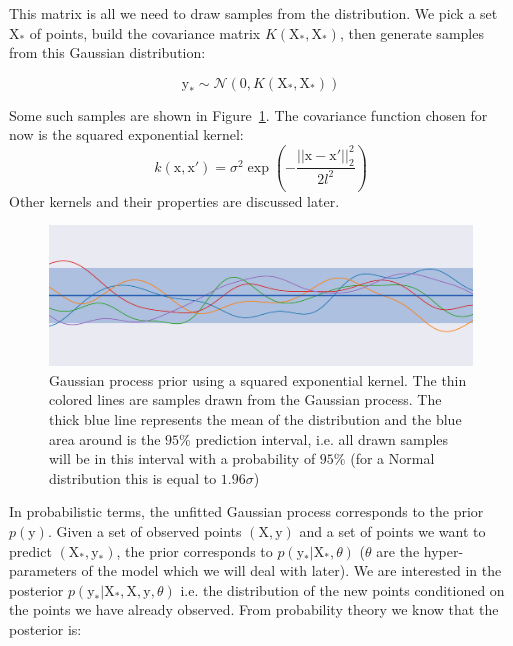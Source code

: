 This matrix is all we need to draw samples from the distribution. We pick a set $\mathrm{X_*}$ of points, build the covariance matrix $K(\mathrm{X_*}, \mathrm{X_*})$, then generate samples from this Gaussian distribution:

\begin{equation}
    \mathrm{y_*} \sim \mathcal{N} \left( 0, K(\mathrm{X_*}, \mathrm{X_*})\right)
\end{equation}

Some such samples are shown in Figure~\ref{fig:gp_prior}. The covariance function chosen for now is the squared exponential kernel:
\begin{equation}
	k(\mathrm{x}, \mathrm{x'}) = \sigma^2 \exp\left( -\frac{||\mathrm{x} - \mathrm{x'}||_2^2}{2l^2}\right)
	\label{eq:sqexp}
\end{equation}
Other kernels and their properties are discussed later. 


\begin{figure}[htb]
	\centering
	\includegraphics[width=\linewidth]{img_hyperopt/gp_prior.png}
	\caption{Gaussian process prior using a squared exponential kernel. The thin colored lines are samples drawn from the Gaussian process. The thick blue line represents the mean of the distribution and the blue area around is the $95 \%$ prediction interval, i.e. all drawn samples will be in this interval with a probability of $95 \%$ (for a Normal distribution this is equal to $1.96 \sigma$)}
	\label{fig:gp_prior}
\end{figure}

In probabilistic terms, the unfitted Gaussian process corresponds to the prior $p \left( \mathrm{y} \right)$. Given a set of observed points $(\mathrm{X}, \mathrm{y})$ and a set of points we want to predict $(\mathrm{X_*}, \mathrm{y_*})$, the prior corresponds to $p\left( \mathrm{y_*} | \mathrm{X_*}, \theta \right)$ ($\theta$ are the hyper-parameters of the model which we will deal with later). We are interested in the posterior $p\left( \mathrm{y_*} | \mathrm{X_*}, \mathrm{X}, \mathrm{y}, \theta \right)$ i.e. the distribution of the new points conditioned on the points we have already observed. From probability theory we know that the posterior is:

